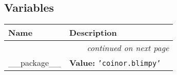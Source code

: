 
  \subsection{Variables}

    \vspace{-1cm}
\hspace{\varindent}\begin{longtable}{|p{\varnamewidth}|p{\vardescrwidth}|l}
\cline{1-2}
\cline{1-2} \centering \textbf{Name} & \centering \textbf{Description}& \\
\cline{1-2}
\endhead\cline{1-2}\multicolumn{3}{r}{\small\textit{continued on next page}}\\\endfoot\cline{1-2}
\endlastfoot\raggedright \_\-\_\-p\-a\-c\-k\-a\-g\-e\-\_\-\_\- & \raggedright \textbf{Value:} 
{\tt \texttt{'}\texttt{coinor.blimpy}\texttt{'}}&\\
\cline{1-2}
\end{longtable}

